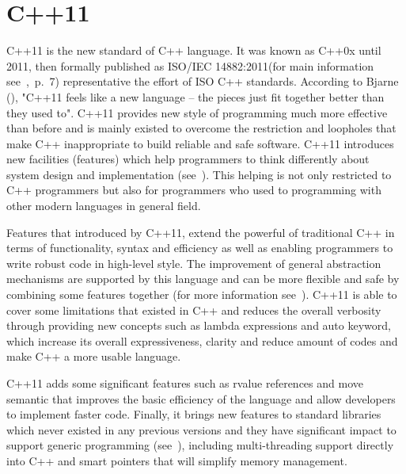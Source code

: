 \documentclass[11pt]{report}
\begin{document}
\section{C++11}
\label{sec: C++11}
C++11 is the new standard of C++ language. It was known as C++0x until 2011, then formally published as ISO/IEC 14882:2011(for main information see~\cite{Josuttis:2012:CppStandard},~p.~7) representative the effort of ISO C++ standards.  According to Bjarne (\cite{Stroustrup:2012:Cpp11}), "C++11 feels like a new language -- the pieces just fit together better than they used to". C++11 provides new style of programming much more effective than before and is mainly existed to overcome the restriction and loopholes that make C++ inappropriate to build reliable and safe software. C++11 introduces new facilities (features) which help programmers to think differently about system design and implementation (see~\cite{Stroustrup:2012:Cpp11}). This helping is not only restricted to C++ programmers but also for programmers who used to programming with other modern languages in general field. 

Features that introduced by C++11, extend the powerful of traditional C++ in terms of functionality, syntax and efficiency as well as enabling programmers to write robust code in high-level style. The improvement of general abstraction mechanisms are supported by this language and can be more flexible and safe by combining some features together (for more information see~\cite{Stroustrup:2012:Cpp11}). C++11 is able to cover some limitations that existed in C++ and reduces the overall verbosity through providing new concepts such as lambda expressions and auto keyword, which increase its overall expressiveness, clarity and reduce amount of codes and make C++ a more usable language.

C++11 adds some significant features such as rvalue references and move semantic that improves the basic efficiency of the language and allow developers to implement faster code. Finally, it brings new features to standard libraries which never existed in any previous versions and they have significant impact to support generic programming (see~\cite{Stroustrup:2012:Cpp11}), including multi-threading support directly into C++ and smart pointers that will simplify memory management.
\end{document}
